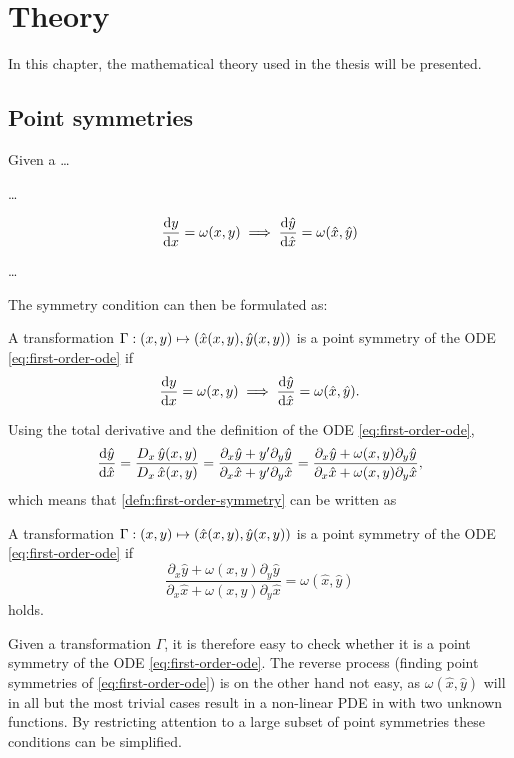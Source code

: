 \chapter{Theory}

In this chapter, the mathematical theory used in the thesis will be presented.

\section{Point symmetries}

Given a \dots

\dots

\begin{equation} \label{eq:first-order-ode}
  \dv{y}{x} = \omega(x,y)
  \implies
  \dv{\hat{y}}{\hat{x}} = \omega(\hat{x},\hat{y})
\end{equation}

\dots

The symmetry condition can then be formulated as: %
\begin{defn} \label{defn:first-order-symmetry}
  A transformation \(\Gamma: \pqty{x,y} \mapsto \pqty{\hat{x}(x,y), \hat{y}(x,y)}\) is a point symmetry of the ODE \ref{eq:first-order-ode} if
  \begin{equation}
    \dv{y}{x} = \omega(x,y)
    \implies
    \dv{\hat{y}}{\hat{x}} = \omega(\hat{x},\hat{y}).
  \end{equation}
\end{defn}
Using the total derivative and the definition of the ODE \ref{eq:first-order-ode},
\begin{equation}
  \dv{\hat{y}}{\hat{x}} = 
  \frac{D_{x}\, \hat{y}(x,y)}{D_{x}\, \hat{x}(x,y)} =
  \frac{\partial_x \hat{y} + y' \partial_y \hat{y}}{\partial_x \hat{x} + y' \partial_y \hat{x}} =
  \frac{\partial_x \hat{y} + \omega(x,y) \partial_y \hat{y}}{\partial_x \hat{x} + \omega(x,y) \partial_y \hat{x}},
\end{equation}
which means that \cref{defn:first-order-symmetry} can be written as
\begin{lem} \label{lem:simple-first-order-symmetry}
  A transformation \(\Gamma: \pqty{x,y} \mapsto \pqty{\hat{x}(x,y), \hat{y}(x,y)}\) is a point symmetry of the ODE \ref{eq:first-order-ode} if
  \begin{equation} \label{eq:simple-first-order-symmetry}
    \frac{\partial_x \hat{y} + \omega(x,y) \partial_y \hat{y}}{\partial_x \hat{x} + \omega(x,y) \partial_y \hat{x}} = \omega(\hat{x},\hat{y})
  \end{equation}
  holds.
\end{lem} %
Given a transformation \(\Gamma\), it is therefore easy to check whether it is a point symmetry of the ODE \ref{eq:first-order-ode}.
The reverse process (finding point symmetries of \cref{eq:first-order-ode}) is on the other hand not easy, as \(\omega(\hat{x},\hat{y})\) will in all but the most trivial cases result in a non-linear PDE in with two unknown functions.
By restricting attention to a large subset of point symmetries these conditions can be simplified.

